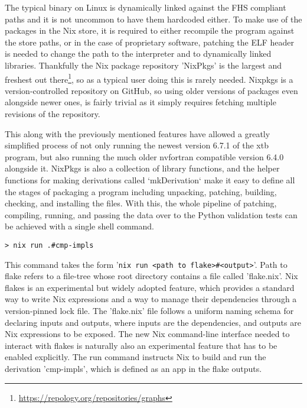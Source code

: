 The typical binary on Linux is dynamically linked against the FHS compliant paths and it is not uncommon to have them hardcoded either. To make use of the packages in the Nix store, it is required to either recompile the program against the store paths, or in the case of proprietary software, patching the ELF header is needed to change the path to the interpreter and to dynamically linked libraries. Thankfully the Nix package repository 'NixPkgs' is the largest and freshest out there\footnote{\url{https://repology.org/repositories/graphs}}, so as a typical user doing this is rarely needed.
Nixpkgs is a version-controlled repository on GitHub, so using older versions of packages even alongside newer ones, is fairly trivial as it simply requires fetching multiple revisions of the repository.

This along with the previously mentioned features have allowed a greatly simplified process of not only running the newest version 6.7.1 of the xtb program, but also running the much older nvfortran compatible version 6.4.0 alongside it.
NixPkgs is also a collection of library functions, and the helper functions for making derivations called `mkDerivation` make it easy to define all the stages of packaging a program including unpacking, patching, building, checking, and installing the files.
With this, the whole pipeline of patching, compiling, running, and passing the data over to the Python validation tests can be achieved with a single shell command.

\begin{verbatim}
> nix run .#cmp-impls
\end{verbatim}


This command takes the form '\verb|nix run <path to flake>#<output>|'. Path to flake refers to a file-tree whose root directory contains a file called 'flake.nix'. Nix flakes is an experimental but widely adopted feature, which provides a standard way to write Nix expressions and a way to manage their dependencies through a version-pinned lock file. The 'flake.nix' file follows a uniform naming schema for declaring inputs and outputs, where inputs are the dependencies, and outputs are Nix expressions to be exposed.
The new Nix command-line interface needed to interact with flakes is naturally also an experimental feature that has to be enabled explicitly. The run command instructs Nix to build and run the derivation 'cmp-impls', which is defined as an app in the flake outputs.

